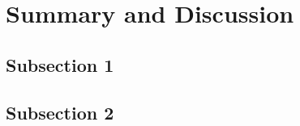 
\section{Summary and Discussion}
\label{sec:summary_discussion}


\subsection{Subsection 1}
\label{subsec:summary_discussion_1}


\subsection{Subsection 2}
\label{subsec:summary_discussion_2}